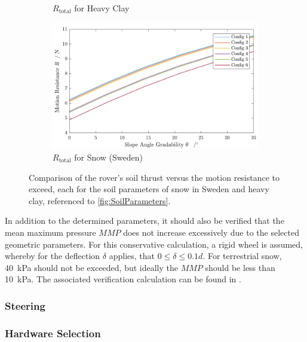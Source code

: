 \begin{figure}[htb]
\begin{subfigure}[b]{0.49\textwidth}
         \caption{\(R_\text{total}\) for Heavy Clay}
         \label{fig:RClay}
     \end{subfigure}
     \hfill
     \begin{subfigure}[b]{0.49\textwidth}
         \centering
         \includegraphics[width=\textwidth]{Media/ResistanceSnow.pdf}
         \caption{\(R_\text{total}\) for Snow (Sweden)}
         \label{fig:RSnow}
     \end{subfigure}
     \caption{Comparison of the rover's soil thrust versus the motion resistance to exceed, each for the soil parameters of snow in Sweden and heavy clay, referenced to \autoref{fig:SoilParameters}.}
     \label{fig:SoilThrust_MotionResistance}
\end{figure}

In addition to the determined parameters, it should also be verified that the mean maximum pressure \(MMP\) does not increase excessively due to the selected geometric parameters. For this conservative calculation, a rigid wheel is assumed, whereby for the deflection \(\delta\) applies, that \( 0 \leq \delta \leq 0.1 d\). For terrestrial snow, 40~kPa should not be exceeded, but ideally the \(MMP\) should be less than 10~kPa. The associated verification calculation can be found in .



\subsubsection*{Steering}
\label{sec:Steering}



\subsubsection*{Hardware Selection}
\label{sec:HardwareLoco}



